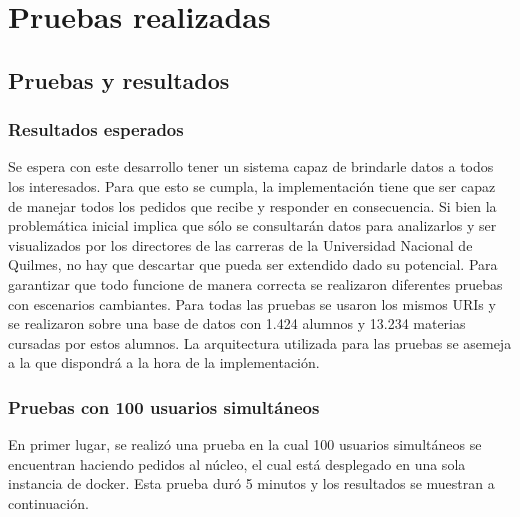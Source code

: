 \chapter{Pruebas realizadas}
\label{sec:implementacion}

\section[Pruebas y resultados]{Pruebas y resultados}

\subsection[Resultados esperados]{Resultados esperados}

Se espera con este desarrollo tener un sistema capaz de brindarle datos a todos los interesados. Para que esto se cumpla, la implementación tiene que ser capaz de manejar todos los pedidos que recibe y responder en consecuencia. 
Si bien la problemática inicial implica que sólo se consultarán datos para analizarlos y ser visualizados por los directores de las carreras de la Universidad Nacional de Quilmes, no hay que descartar que pueda ser extendido dado su potencial.
Para garantizar que todo funcione de manera correcta se realizaron diferentes pruebas con escenarios cambiantes.
Para todas las pruebas se usaron los mismos URIs y se realizaron sobre una base de datos con 1.424 alumnos y 13.234 materias cursadas por estos alumnos.
La arquitectura utilizada para las pruebas se asemeja a la que dispondrá a la hora de la implementación.


\break
\subsection{Pruebas con 100 usuarios simultáneos}
\break
En primer lugar, se realizó una prueba en la cual 100 usuarios simultáneos se encuentran haciendo pedidos al núcleo, el cual está desplegado en una sola instancia de docker.
Esta prueba duró 5 minutos y los resultados se muestran a continuación.


